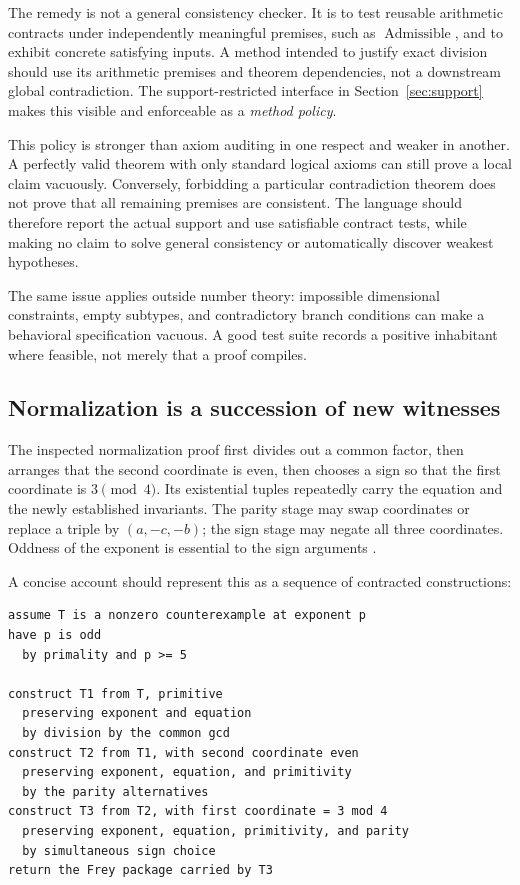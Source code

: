 \documentclass[11pt,a4paper]{article}
\theoremstyle{plain}\newtheorem{proposition}{Proposition}[section]
\theoremstyle{definition}\newtheorem{definition}[proposition]{Definition}
\theoremstyle{remark}\newtheorem{remark}[proposition]{Remark}
\begin{document}
The remedy is not a general consistency checker. It is to test reusable arithmetic contracts under independently meaningful premises, such as \(\operatorname{Admissible}\), and to exhibit concrete satisfying inputs. A method intended to justify exact division should use its arithmetic premises and theorem dependencies, not a downstream global contradiction. The support-restricted interface in Section~\ref{sec:support} makes this visible and enforceable as a \emph{method policy}.

This policy is stronger than axiom auditing in one respect and weaker in another. A perfectly valid theorem with only standard logical axioms can still prove a local claim vacuously. Conversely, forbidding a particular contradiction theorem does not prove that all remaining premises are consistent. The language should therefore report the actual support and use satisfiable contract tests, while making no claim to solve general consistency or automatically discover weakest hypotheses.

The same issue applies outside number theory: impossible dimensional constraints, empty subtypes, and contradictory branch conditions can make a behavioral specification vacuous. A good test suite records a positive inhabitant where feasible, not merely that a proof compiles.

\subsection{Normalization is a succession of new witnesses}
The inspected normalization proof first divides out a common factor, then arranges that the second coordinate is even, then chooses a sign so that the first coordinate is \(3\pmod4\). Its existential tuples repeatedly carry the equation and the newly established invariants. The parity stage may swap coordinates or replace a triple by \((a,-c,-b)\); the sign stage may negate all three coordinates. Oddness of the exponent is essential to the sign arguments \cite{freynorm}.

A concise account should represent this as a sequence of contracted constructions:
\begin{lstlisting}
assume T is a nonzero counterexample at exponent p
have p is odd
  by primality and p >= 5

construct T1 from T, primitive
  preserving exponent and equation
  by division by the common gcd
construct T2 from T1, with second coordinate even
  preserving exponent, equation, and primitivity
  by the parity alternatives
construct T3 from T2, with first coordinate = 3 mod 4
  preserving exponent, equation, primitivity, and parity
  by simultaneous sign choice
return the Frey package carried by T3
\end{lstlisting}
\end{document}
